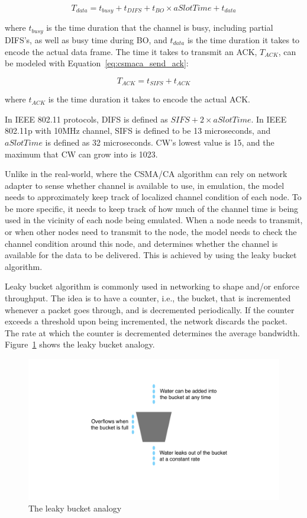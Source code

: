 \documentclass[12pt]{report}
\begin{document}
\begin{equation}
  T_{data}=t_{busy}+t_{DIFS}+t_{BO}\times aSlotTime+t_{data}
  \label{eq:csmaca_send_data}
\end{equation}

where $t_{busy}$ is the time duration that the channel is busy, including partial DIFS's, as well as busy time during BO, and $t_{data}$ is the time duration it takes to encode the actual data frame. The time it takes to transmit an ACK, $T_{ACK}$, can be modeled with Equation~\ref{eq:csmaca_send_ack}:

\begin{equation}
  T_{ACK}=t_{SIFS}+t_{ACK}
  \label{eq:csmaca_send_ack}
\end{equation}

where $t_{ACK}$ is the time duration it takes to encode the actual ACK.

In IEEE 802.11 protocols, DIFS is defined as $SIFS + 2 \times aSlotTime$. In IEEE 802.11p with 10MHz channel, SIFS is defined to be 13 microseconds, and $aSlotTime$ is defined as 32 microseconds. CW's lowest value is 15, and the maximum that CW can grow into is 1023. \cite{ieee201280211macphy}

Unlike in the real-world, where the CSMA/CA algorithm can rely on network adapter to sense whether channel is available to use, in emulation, the model needs to approximately keep track of localized channel condition of each node. To be more specific, it needs to keep track of how much of the channel time is being used in the vicinity of each node being emulated. When a node needs to transmit, or when other nodes need to transmit to the node, the model needs to check the channel condition around this node, and determines whether the channel is available for the data to be delivered. This is achieved by using the leaky bucket algorithm.

Leaky bucket algorithm \cite{turner1986,yin1991} is commonly used in networking to shape and/or enforce throughput. The idea is to have a counter, i.e., the bucket, that is incremented whenever a packet goes through, and is decremented periodically. If the counter exceeds a threshold upon being incremented, the network discards the packet. The rate at which the counter is decremented determines the average bandwidth. Figure~\ref{fig:leaky_bucket} shows the leaky bucket analogy.

\begin{figure}[h]
  \begin{center}
    \includegraphics[width=.6\textwidth]{figures/leakyBucket.pdf}
    \caption{\label{fig:leaky_bucket}The leaky bucket analogy}
  \end{center}
\end{figure}
\end{document}
